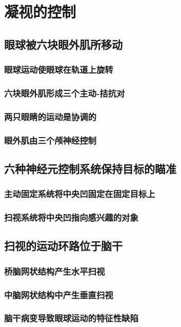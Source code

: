 \chapter{凝视的控制}

\section{眼球被六块眼外肌所移动}
\subsection{眼球运动使眼球在轨道上旋转}
\subsection{六块眼外肌形成三个主动-拮抗对}
\subsection{两只眼睛的运动是协调的}
\subsection{眼外肌由三个颅神经控制}

\section{六种神经元控制系统保持目标的瞄准}
\subsection{主动固定系统将中央凹固定在固定目标上}
\subsection{扫视系统将中央凹指向感兴趣的对象}

\section{扫视的运动环路位于脑干}
\subsection{桥脑网状结构产生水平扫视}
\subsection{中脑网状结构中产生垂直扫视}
\subsection{脑干病变导致眼球运动的特征性缺陷}

